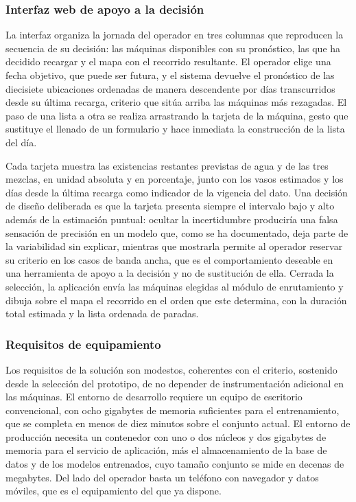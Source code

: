 \subsubsection{Interfaz web de apoyo a la decisión}\label{interfaz-web-de-apoyo-a-la-decision}

La interfaz organiza la jornada del operador en tres columnas que reproducen la secuencia de su decisión: las máquinas disponibles con su pronóstico, las que ha decidido recargar y el mapa con el recorrido resultante. El operador elige una fecha objetivo, que puede ser futura, y el sistema devuelve el pronóstico de las diecisiete ubicaciones ordenadas de manera descendente por días transcurridos desde su última recarga, criterio que sitúa arriba las máquinas más rezagadas. El paso de una lista a otra se realiza arrastrando la tarjeta de la máquina, gesto que sustituye el llenado de un formulario y hace inmediata la construcción de la lista del día.

Cada tarjeta muestra las existencias restantes previstas de agua y de las tres mezclas, en unidad absoluta y en porcentaje, junto con los vasos estimados y los días desde la última recarga como indicador de la vigencia del dato. Una decisión de diseño deliberada es que la tarjeta presenta siempre el intervalo bajo y alto además de la estimación puntual: ocultar la incertidumbre produciría una falsa sensación de precisión en un modelo que, como se ha documentado, deja parte de la variabilidad sin explicar, mientras que mostrarla permite al operador reservar su criterio en los casos de banda ancha, que es el comportamiento deseable en una herramienta de apoyo a la decisión y no de sustitución de ella. Cerrada la selección, la aplicación envía las máquinas elegidas al módulo de enrutamiento y dibuja sobre el mapa el recorrido en el orden que este determina, con la duración total estimada y la lista ordenada de paradas.

\subsubsection{Requisitos de equipamiento}\label{requisitos-de-equipamiento}

Los requisitos de la solución son modestos, coherentes con el criterio, sostenido desde la selección del prototipo, de no depender de instrumentación adicional en las máquinas. El entorno de desarrollo requiere un equipo de escritorio convencional, con ocho gigabytes de memoria suficientes para el entrenamiento, que se completa en menos de diez minutos sobre el conjunto actual. El entorno de producción necesita un contenedor con uno o dos núcleos y dos gigabytes de memoria para el servicio de aplicación, más el almacenamiento de la base de datos y de los modelos entrenados, cuyo tamaño conjunto se mide en decenas de megabytes. Del lado del operador basta un teléfono con navegador y datos móviles, que es el equipamiento del que ya dispone.

